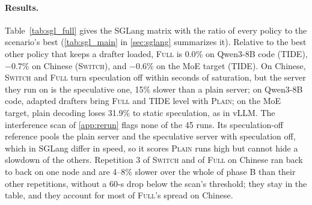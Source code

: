 \documentclass{article}
\newcommand{\pol}[1]{\textsc{#1}}
\begin{document}
\paragraph{Results.} Table~\ref{tab:sgl_full} gives the SGLang matrix with the ratio of every policy to the scenario's best (\cref{tab:sgl_main} in \cref{sec:sglang} summarizes it). Relative to the best other policy that keeps a drafter loaded, \pol{Full} is $0.0$\% on Qwen3-8B code (\pol{TIDE}), $-0.7$\% on Chinese (\pol{Switch}), and $-0.6$\% on the MoE target (\pol{TIDE}). On Chinese, \pol{Switch} and \pol{Full} turn speculation off within seconds of saturation, but the server they run on is the speculative one, 15\% slower than a plain server; on Qwen3-8B code, adapted drafters bring \pol{Full} and \pol{TIDE} level with \pol{Plain}; on the MoE target, plain decoding loses 31.9\% to static speculation, as in vLLM. The interference scan of \cref{app:rerun} flags none of the 45 runs. Its speculation-off reference pools the plain server and the speculative server with speculation off, which in SGLang differ in speed, so it scores \pol{Plain} runs high but cannot hide a slowdown of the others. Repetition 3 of \pol{Switch} and of \pol{Full} on Chinese ran back to back on one node and are 4--8\% slower over the whole of phase B than their other repetitions, without a 60-s drop below the scan's threshold; they stay in the table, and they account for most of \pol{Full}'s spread on Chinese.
\end{document}
